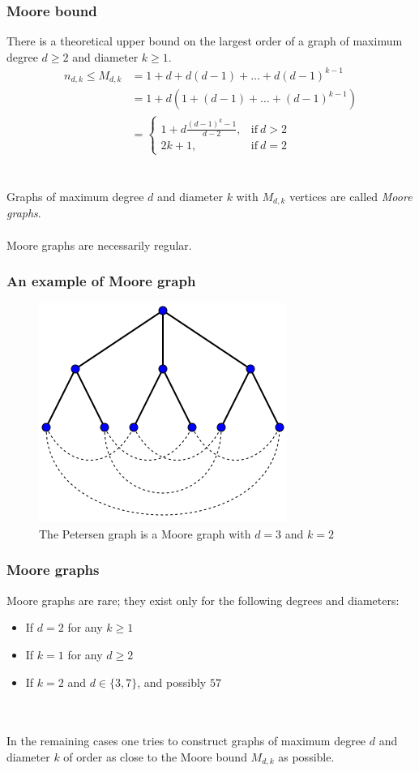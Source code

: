 \documentclass{beamer}
\begin{document}
\begin{frame}
	\frametitle{Moore bound}
	There is a theoretical upper bound on the largest order of a graph of maximum degree $d\ge 2$ and diameter $k\ge 1$.
	\begin{equation}\label{eq:Moore}
		\begin{split}
			n_{d,k} \leq M_{d,k}    & = 1 + d + d(d - 1) + \dots + d(d - 1)^{k-1}  \\
									& = 1 + d(1 + (d - 1) + \dots + (d - 1)^{k-1}) \\
									& = \begin{cases}
											1+d\frac{(d-1)^{k}-1}{d-2}, & \text{if}\ d > 2 \\
											2k+1, & \text{if}\ d=2
										\end{cases}
		\end{split}
	\end{equation} ~\\~\\
	Graphs of maximum degree $d$ and diameter $k$ with $M_{d,k}$ vertices are called {\em Moore graphs}. \\~\\
	Moore graphs are necessarily regular.
\end{frame}
\begin{frame}
	\frametitle{An example of Moore graph}
		\begin{figure}[!ht]
    		\centering
    		\includegraphics[scale=0.8]{petersen-moore.png}
    		\caption{The Petersen graph is a Moore graph with $d=3$ and $k=2$ }
		\end{figure}
\end{frame}
\begin{frame}
	\frametitle{Moore graphs}
	Moore graphs are rare; they exist only for the following degrees and diameters: ~\\
	\begin{itemize}
		\item If $d = 2$ for any $k \geq 1$
		\item If $k = 1$ for any $d \geq 2$
		\item If $k = 2$ and $d \in \{3, 7 \}$, and possibly $57$
	\end{itemize} ~\\~\\
	In the remaining cases one tries to construct graphs of maximum degree $d$ and diameter $k$ of order as close to the Moore bound $M_{d,k}$ as possible.
\end{frame}
\end{document}
